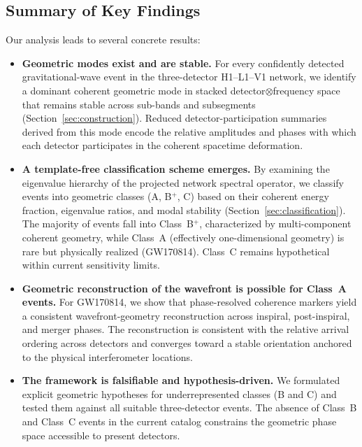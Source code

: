 \documentclass[11pt,a4paper]{article}
\begin{document}
\subsection{Summary of Key Findings}
Our analysis leads to several concrete results:

\begin{itemize}
    \item \textbf{Geometric modes exist and are stable.} For every confidently detected gravitational-wave event in the three-detector H1--L1--V1 network, we identify a dominant coherent geometric mode in stacked detector$\otimes$frequency space that remains stable across sub-bands and subsegments (Section~\ref{sec:construction}). Reduced detector-participation summaries derived from this mode encode the relative amplitudes and phases with which each detector participates in the coherent spacetime deformation.

    \item \textbf{A template-free classification scheme emerges.} By examining the eigenvalue hierarchy of the projected network spectral operator, we classify events into geometric classes (A, B$^+$, C) based on their coherent energy fraction, eigenvalue ratios, and modal stability (Section~\ref{sec:classification}). The majority of events fall into Class~B$^+$, characterized by multi-component coherent geometry, while Class~A (effectively one-dimensional geometry) is rare but physically realized (GW170814). Class~C remains hypothetical within current sensitivity limits.

    \item \textbf{Geometric reconstruction of the wavefront is possible for Class~A events.} For GW170814, we show that phase-resolved coherence markers yield a consistent wavefront-geometry reconstruction across inspiral, post-inspiral, and merger phases. The reconstruction is consistent with the relative arrival ordering across detectors and converges toward a stable orientation anchored to the physical interferometer locations.

    \item \textbf{The framework is falsifiable and hypothesis-driven.} We formulated explicit geometric hypotheses for underrepresented classes (B and C) and tested them against all suitable three-detector events. The absence of Class~B and Class~C events in the current catalog constrains the geometric phase space accessible to present detectors.
\end{itemize}
\end{document}
